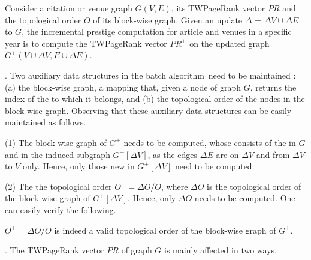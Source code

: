 Consider a citation or venue graph $G(V, E)$, its TWPageRank vector $PR$ and the topological order $O$ of its block-wise graph. Given an update $\Delta$ = $\Delta V\cup\Delta E$ to $G$, the incremental prestige computation for article and venues in a specific year is to compute the TWPageRank vector $PR^+$ on the updated graph $G^+(V\cup\Delta V, E\cup\Delta E)$.


. 
Two auxiliary data structures in the batch algorithm~\twprscc need to be maintained : (a) the block-wise graph,  a mapping that, given a node of graph $G$, returns the index of the \scc to which it belongs, and (b) the topological order of the nodes in the block-wise graph.
%
Observing that these auxiliary data structures can be easily maintained as follows.



\noindent(1) The block-wise graph of $G^+$ needs to be computed, whose \sccs consists of the \sccs in $G$ and \sccs in the induced subgraph $G^+[\Delta V]$, as  the edges $\Delta E$ are  on $\Delta V$ and from $\Delta V$  to $V$ only. Hence, only those new \sccs in $G^+[\Delta V]$ need to be computed.

\noindent(2) The the topological order $O^+=\Delta O/O$, where $\Delta O$ is the topological order of the block-wise graph of $G^+[\Delta V]$. Hence, only $\Delta O$ needs to be computed. One can easily verify the following.


\begin{prop} \label{lemma-inc-topo}
 $O^+=\Delta O/O$ is indeed a valid topological order of the block-wise graph of $G^+$.
\end{prop}



.
The TWPageRank vector $PR$ of graph $G$ is mainly affected in two ways.



